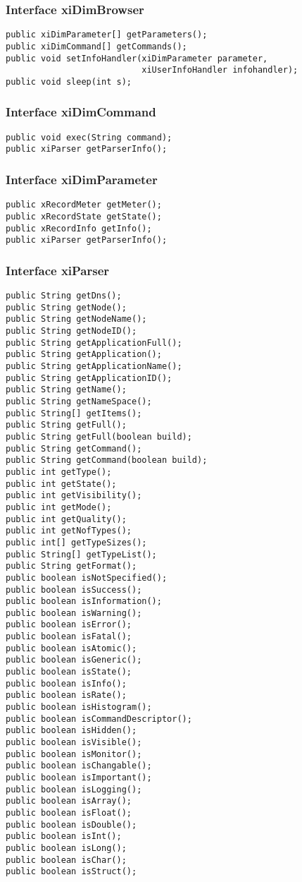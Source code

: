 \subsubsection{Interface xiDimBrowser}
\begin{verbatim}
public xiDimParameter[] getParameters();
public xiDimCommand[] getCommands();
public void setInfoHandler(xiDimParameter parameter, 
                           xiUserInfoHandler infohandler);
public void sleep(int s);
\end{verbatim}

\subsubsection{Interface xiDimCommand}
\begin{verbatim}
public void exec(String command);
public xiParser getParserInfo();
\end{verbatim}

\subsubsection{Interface xiDimParameter}
\begin{verbatim}
public xRecordMeter getMeter();
public xRecordState getState();
public xRecordInfo getInfo();
public xiParser getParserInfo();
\end{verbatim}

\subsubsection{Interface xiParser}
\begin{verbatim}
public String getDns();
public String getNode();
public String getNodeName();
public String getNodeID();
public String getApplicationFull();
public String getApplication();
public String getApplicationName();
public String getApplicationID();
public String getName();
public String getNameSpace();
public String[] getItems();
public String getFull();
public String getFull(boolean build);
public String getCommand();
public String getCommand(boolean build);
public int getType();
public int getState();
public int getVisibility();
public int getMode();
public int getQuality();
public int getNofTypes();
public int[] getTypeSizes();
public String[] getTypeList();
public String getFormat();
public boolean isNotSpecified();
public boolean isSuccess();
public boolean isInformation();
public boolean isWarning();
public boolean isError();
public boolean isFatal();
public boolean isAtomic();
public boolean isGeneric();
public boolean isState();
public boolean isInfo();
public boolean isRate();
public boolean isHistogram();
public boolean isCommandDescriptor();
public boolean isHidden();
public boolean isVisible();
public boolean isMonitor();
public boolean isChangable();
public boolean isImportant();
public boolean isLogging();
public boolean isArray();
public boolean isFloat();
public boolean isDouble();
public boolean isInt();
public boolean isLong();
public boolean isChar();
public boolean isStruct();
\end{verbatim}
